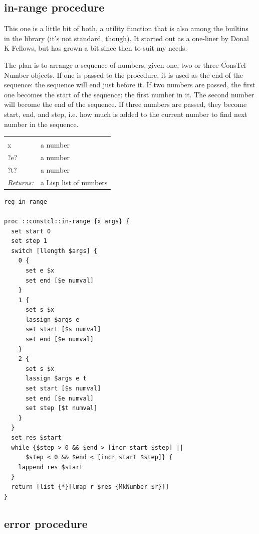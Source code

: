 \documentclass[a5paper,draft]{memoir}
\begin{document}
\subsection{in-range procedure}
\label{inrange-procedure}

This one is a little bit of both, a utility function that is also among the builtins in the library (it's not standard, though). It started out as a one-liner by Donal K Fellows, but has grown a bit since then to suit my needs.

The plan is to arrange a sequence of numbers, given one, two or three ConsTcl Number objects. If one is passed to the procedure, it is used as the end of the sequence: the sequence will end just before it. If two numbers are passed, the first one becomes the start of the sequence: the first number in it. The second number will become the end of the sequence. If three numbers are passed, they become start, end, and step, i.e. how much is added to the current number to find next number in the sequence.

\noindent\begin{tabular}{ |p{1.9cm} p{6.5cm}| }
\hline
\rowcolor[HTML]{CCCCCC} \multicolumn{2}{|l|}{\textbf{in-range (public)}} \\
x & a number \\
?e? & a number \\
?t? & a number \\
\textit{Returns:} & a Lisp list of numbers \\
\hline
\end{tabular}

\begin{lstlisting}
reg in-range

proc ::constcl::in-range {x args} {
  set start 0
  set step 1
  switch [llength $args] {
    0 {
      set e $x
      set end [$e numval]
    }
    1 {
      set s $x
      lassign $args e
      set start [$s numval]
      set end [$e numval]
    }
    2 {
      set s $x
      lassign $args e t
      set start [$s numval]
      set end [$e numval]
      set step [$t numval]
    }
  }
  set res $start
  while {$step > 0 && $end > [incr start $step] ||
      $step < 0 && $end < [incr start $step]} {
    lappend res $start
  }
  return [list {*}[lmap r $res {MkNumber $r}]]
}
\end{lstlisting}

\subsection{error procedure}
\label{error-procedure}
\end{document}
